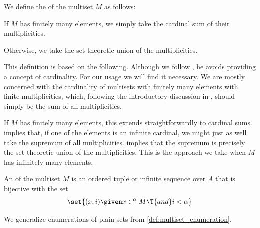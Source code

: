 \begin{definition}\label{def:multiset_cardinality}\mimprovised
  We define the  of the \hyperref[def:multiset]{multiset} \( M \) as follows:
  \begin{thmenum}
     If \( M \) has finitely many elements, we simply take the \hyperref[def:cardinal_addition]{cardinal sum} of their multiplicities.

     Otherwise, we take the set-theoretic union of the multiplicities.
  \end{thmenum}
\end{definition}
\begin{comments}
  \item This definition is based on the following. Although we follow \textcite[def. 1]{Hickman1980Multisets}, he avoids providing a concept of cardinality. For our usage we will find it necessary. We are mostly concerned with the cardinality of multisets with finitely many elements with finite multiplicities, which, following the introductory discussion in \cite[1]{Blizard1988MultisetTheory}, should simply be the sum of all multiplicities.

  If \( M \) has finitely many elements, this extends straightforwardly to cardinal sums.  implies that, if one of the elements is an infinite cardinal, we might just as well take the supremum of all multiplicities.  implies that the supremum is precisely the set-theoretic union of the multiplicities. This is the approach we take when \( M \) has infinitely many elements.
\end{comments}

\begin{definition}\label{def:multiset_enumeration}\mimprovised
  An  of the \hyperref[def:multiset]{multiset} \( M \) is an \hyperref[def:ordered_tuple]{ordered tuple} or \hyperref[def:sequence]{infinite sequence} over \( A \) that is bijective with the set
  \begin{equation*}
    \set{ (x, i) \given x \in^\alpha M \T{and} i < \alpha }
  \end{equation*}
\end{definition}
\begin{comments}
  \item We generalize enumerations of plain sets from \cref{def:multiset_enumeration}.
\end{comments}
